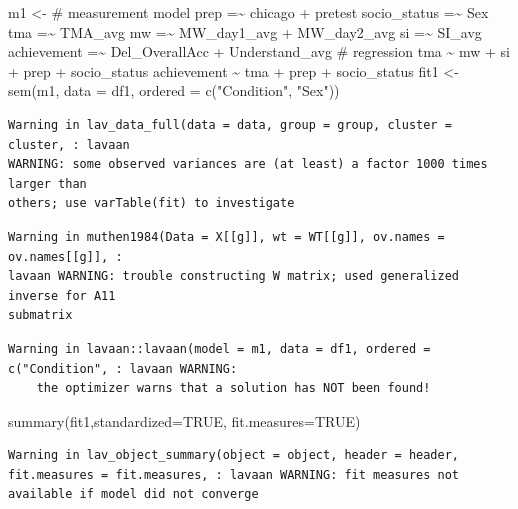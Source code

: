 \documentclass[
  letterpaper,
  DIV=11,
  numbers=noendperiod]{scrartcl}
\newenvironment{Shaded}{\begin{snugshade}}{\end{snugshade}}
\newcommand{\AttributeTok}[1]{\textcolor[rgb]{0.40,0.45,0.13}{#1}}
\newcommand{\ConstantTok}[1]{\textcolor[rgb]{0.56,0.35,0.01}{#1}}
\newcommand{\FunctionTok}[1]{\textcolor[rgb]{0.28,0.35,0.67}{#1}}
\newcommand{\NormalTok}[1]{\textcolor[rgb]{0.00,0.23,0.31}{#1}}
\newcommand{\OtherTok}[1]{\textcolor[rgb]{0.00,0.23,0.31}{#1}}
\newcommand{\StringTok}[1]{\textcolor[rgb]{0.13,0.47,0.30}{#1}}
\begin{document}
\begin{Shaded}
\begin{Highlighting}[]
\NormalTok{m1 }\OtherTok{\textless{}{-}} \StringTok{\textquotesingle{}}
\StringTok{\# measurement model}
\StringTok{prep =\textasciitilde{} chicago + pretest}
\StringTok{socio\_status =\textasciitilde{} Sex}
\StringTok{tma =\textasciitilde{} TMA\_avg}
\StringTok{mw =\textasciitilde{} MW\_day1\_avg + MW\_day2\_avg}
\StringTok{si =\textasciitilde{} SI\_avg}
\StringTok{achievement =\textasciitilde{} Del\_OverallAcc + Understand\_avg}
\StringTok{\# regression}
\StringTok{tma \textasciitilde{} mw + si + prep + socio\_status}
\StringTok{achievement \textasciitilde{} tma + prep + socio\_status}
\StringTok{\textquotesingle{}}
\NormalTok{fit1 }\OtherTok{\textless{}{-}} \FunctionTok{sem}\NormalTok{(m1, }\AttributeTok{data =}\NormalTok{ df1,}
            \AttributeTok{ordered =} \FunctionTok{c}\NormalTok{(}\StringTok{"Condition"}\NormalTok{, }\StringTok{"Sex"}\NormalTok{))}
\end{Highlighting}
\end{Shaded}

\begin{verbatim}
Warning in lav_data_full(data = data, group = group, cluster = cluster, : lavaan
WARNING: some observed variances are (at least) a factor 1000 times larger than
others; use varTable(fit) to investigate
\end{verbatim}

\begin{verbatim}
Warning in muthen1984(Data = X[[g]], wt = WT[[g]], ov.names = ov.names[[g]], :
lavaan WARNING: trouble constructing W matrix; used generalized inverse for A11
submatrix
\end{verbatim}

\begin{verbatim}
Warning in lavaan::lavaan(model = m1, data = df1, ordered = c("Condition", : lavaan WARNING:
    the optimizer warns that a solution has NOT been found!
\end{verbatim}

\begin{Shaded}
\begin{Highlighting}[]
\FunctionTok{summary}\NormalTok{(fit1,}\AttributeTok{standardized=}\ConstantTok{TRUE}\NormalTok{, }\AttributeTok{fit.measures=}\ConstantTok{TRUE}\NormalTok{)}
\end{Highlighting}
\end{Shaded}

\begin{verbatim}
Warning in lav_object_summary(object = object, header = header, fit.measures = fit.measures, : lavaan WARNING: fit measures not available if model did not converge
\end{verbatim}
\end{document}
